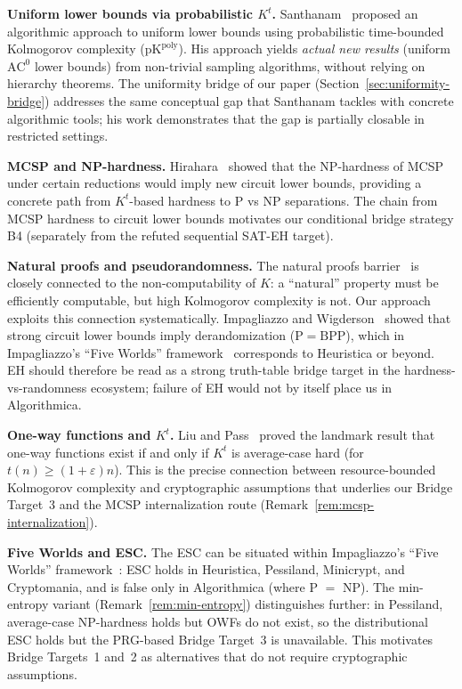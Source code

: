 \documentclass[aps,prd,twocolumn,superscriptaddress,nofootinbib]{revtex4-2}
\theoremstyle{definition}
\theoremstyle{remark}
\begin{document}
\textbf{Uniform lower bounds via probabilistic $K^t$.}
Santhanam~\cite{Santhanam2023} proposed an algorithmic approach to uniform lower bounds using probabilistic time-bounded Kolmogorov complexity ($\mathrm{pK}^{\mathrm{poly}}$). His approach yields \emph{actual new results} (uniform $\mathrm{AC}^0$ lower bounds) from non-trivial sampling algorithms, without relying on hierarchy theorems. The uniformity bridge of our paper (Section~\ref{sec:uniformity-bridge}) addresses the same conceptual gap that Santhanam tackles with concrete algorithmic tools; his work demonstrates that the gap is partially closable in restricted settings.

\textbf{MCSP and NP-hardness.}
Hirahara~\cite{Hirahara2018} showed that the NP-hardness of MCSP under certain reductions would imply new circuit lower bounds, providing a concrete path from $K^t$-based hardness to P vs NP separations. The chain from MCSP hardness to circuit lower bounds motivates our conditional bridge strategy B4 (separately from the refuted sequential SAT-EH target).

\textbf{Natural proofs and pseudorandomness.}
The natural proofs barrier~\cite{RazborovRudich1997} is closely connected to the non-computability of $K$: a ``natural'' property must be efficiently computable, but high Kolmogorov complexity is not. Our approach exploits this connection systematically. Impagliazzo and Wigderson~\cite{ImpagliazzoWigderson1997} showed that strong circuit lower bounds imply derandomization ($\mathrm{P} = \mathrm{BPP}$), which in Impagliazzo's ``Five Worlds'' framework~\cite{Impagliazzo1995} corresponds to Heuristica or beyond. EH should therefore be read as a strong truth-table bridge target in the hardness-vs-randomness ecosystem; failure of EH would not by itself place us in Algorithmica.

\textbf{One-way functions and $K^t$.}
Liu and Pass~\cite{LiuPass2020} proved the landmark result that one-way functions exist if and only if $K^t$ is average-case hard (for $t(n) \geq (1+\varepsilon)n$). This is the precise connection between resource-bounded Kolmogorov complexity and cryptographic assumptions that underlies our Bridge Target~3 and the MCSP internalization route (Remark~\ref{rem:mcsp-internalization}).

\textbf{Five Worlds and ESC.}
The ESC can be situated within Impagliazzo's ``Five Worlds'' framework~\cite{Impagliazzo1995}: ESC holds in Heuristica, Pessiland, Minicrypt, and Cryptomania, and is false only in Algorithmica (where P $=$ NP). The min-entropy variant (Remark~\ref{rem:min-entropy}) distinguishes further: in Pessiland, average-case NP-hardness holds but OWFs do not exist, so the distributional ESC holds but the PRG-based Bridge Target~3 is unavailable. This motivates Bridge Targets~1 and~2 as alternatives that do not require cryptographic assumptions.
\end{document}
